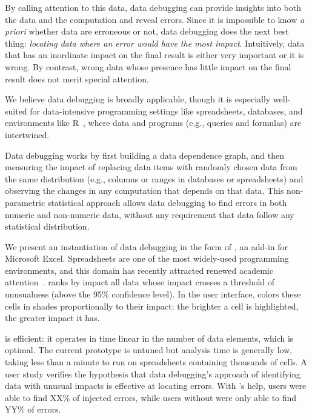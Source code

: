 By calling attention to this data, data debugging can provide insights
into both the data and the computation and reveal errors. Since it is
impossible to know \emph{a priori} whether data are erroneous or not,
data debugging does the next best thing: \emph{locating data where an
error would have the most impact}. Intuitively, data that has an
inordinate impact on the final result is either very important or it
is wrong. By contrast, wrong data whose presence has little impact on
the final result does not merit special attention.

We believe data debugging is broadly applicable, though it is
especially well-suited for data-intensive programming settings
like spreadsheets, databases, and environments like
R~\cite{ihaka1996r}, where data and programs (e.g., queries and
formulas) are intertwined.

Data debugging works by first building a data dependence graph, and
then measuring the impact of replacing data items with randomly chosen
data from the same distribution (e.g., columns or ranges in databases
or spreadsheets) and observing the changes in any computation that
depends on that data. This non-parametric statistical approach allows
data debugging to find errors in both numeric and non-numeric data,
without any requirement that data follow any statistical distribution.

We present an instantiation of data debugging in the form
of \checkcell{}, an add-in for Microsoft Excel. Spreadsheets are one
of the most widely-used programming environments, and this domain has
recently attracted renewed academic
attention~\cite{DBLP:conf/popl/Gulwani11,DBLP:conf/pldi/HarrisG11,Singh:2012:LSS:2212351.2212356}.
\checkcell{} ranks by impact all data whose
impact crosses a threshold of unusualness (above the 95\% confidence
level).  In the user interface, \checkcell{} colors these cells in
shades proportionally to their impact: the brighter a cell is
highlighted, the greater impact it has.

\checkcell{} is efficient: it operates in time linear in the number
of data elements, which is optimal. The current prototype is untuned
but analysis time is generally low, taking less than a minute to run
on spreadsheets containing thousands of cells. A user study verifies
the hypothesis that data debugging's approach of identifying data with
unusual impacts is effective at locating errors. With \checkcell{}'s
help, users were able to find XX\% of injected errors, while users
without \checkcell{} were only able to find YY\% of errors.


